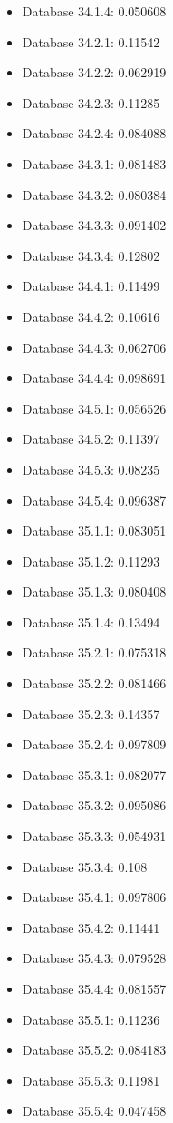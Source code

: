 \begin{itemize}
\item Database 34.1.4: 0.050608
\item Database 34.2.1: 0.11542
\item Database 34.2.2: 0.062919
\item Database 34.2.3: 0.11285
\item Database 34.2.4: 0.084088
\item Database 34.3.1: 0.081483
\item Database 34.3.2: 0.080384
\item Database 34.3.3: 0.091402
\item Database 34.3.4: 0.12802
\item Database 34.4.1: 0.11499
\item Database 34.4.2: 0.10616
\item Database 34.4.3: 0.062706
\item Database 34.4.4: 0.098691
\item Database 34.5.1: 0.056526
\item Database 34.5.2: 0.11397
\item Database 34.5.3: 0.08235
\item Database 34.5.4: 0.096387
\item Database 35.1.1: 0.083051
\item Database 35.1.2: 0.11293
\item Database 35.1.3: 0.080408
\item Database 35.1.4: 0.13494
\item Database 35.2.1: 0.075318
\item Database 35.2.2: 0.081466
\item Database 35.2.3: 0.14357
\item Database 35.2.4: 0.097809
\item Database 35.3.1: 0.082077
\item Database 35.3.2: 0.095086
\item Database 35.3.3: 0.054931
\item Database 35.3.4: 0.108
\item Database 35.4.1: 0.097806
\item Database 35.4.2: 0.11441
\item Database 35.4.3: 0.079528
\item Database 35.4.4: 0.081557
\item Database 35.5.1: 0.11236
\item Database 35.5.2: 0.084183
\item Database 35.5.3: 0.11981
\item Database 35.5.4: 0.047458

\end{itemize}
